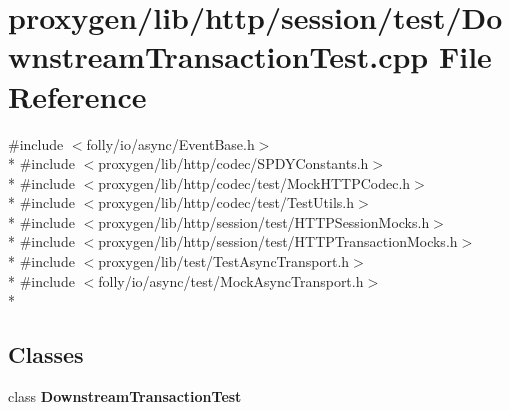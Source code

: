 \section{proxygen/lib/http/session/test/\+Downstream\+Transaction\+Test.cpp File Reference}
\label{DownstreamTransactionTest_8cpp}
{\ttfamily \#include $<$folly/io/async/\+Event\+Base.\+h$>$}\\*
{\ttfamily \#include $<$proxygen/lib/http/codec/\+S\+P\+D\+Y\+Constants.\+h$>$}\\*
{\ttfamily \#include $<$proxygen/lib/http/codec/test/\+Mock\+H\+T\+T\+P\+Codec.\+h$>$}\\*
{\ttfamily \#include $<$proxygen/lib/http/codec/test/\+Test\+Utils.\+h$>$}\\*
{\ttfamily \#include $<$proxygen/lib/http/session/test/\+H\+T\+T\+P\+Session\+Mocks.\+h$>$}\\*
{\ttfamily \#include $<$proxygen/lib/http/session/test/\+H\+T\+T\+P\+Transaction\+Mocks.\+h$>$}\\*
{\ttfamily \#include $<$proxygen/lib/test/\+Test\+Async\+Transport.\+h$>$}\\*
{\ttfamily \#include $<$folly/io/async/test/\+Mock\+Async\+Transport.\+h$>$}\\*
\subsection*{Classes}
\begin{DoxyCompactItemize}
\item 
class {\bf Downstream\+Transaction\+Test}
\end{DoxyCompactItemize}
